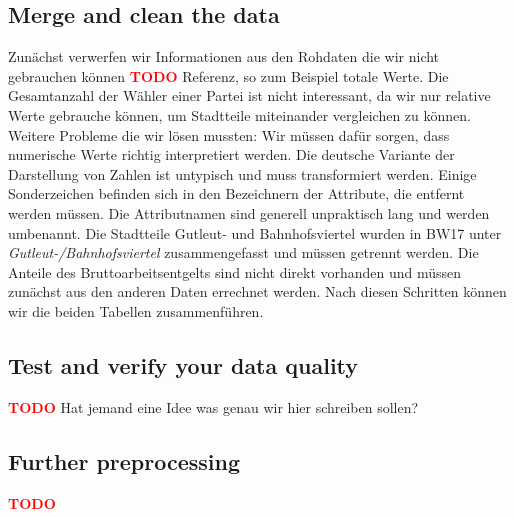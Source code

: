 \documentclass[a4paper,10pt]{scrartcl}
\newcommand{\TODO}{\textcolor{red}{\textbf{TODO }}}
\begin{document}
\subsection{Merge and clean the data}
Zunächst verwerfen wir Informationen aus den Rohdaten die wir nicht gebrauchen können \TODO{Referenz}, so zum Beispiel totale Werte. Die Gesamtanzahl der Wähler einer Partei ist nicht interessant, da wir nur relative Werte gebrauche können, um Stadtteile miteinander vergleichen zu können. Weitere Probleme die wir lösen mussten: Wir müssen dafür sorgen, dass numerische Werte richtig interpretiert werden. Die deutsche Variante der Darstellung von Zahlen ist untypisch und muss transformiert werden. Einige Sonderzeichen befinden sich in den Bezeichnern der Attribute, die entfernt werden müssen. Die Attributnamen sind generell unpraktisch lang und werden umbenannt. Die Stadtteile Gutleut- und Bahnhofsviertel wurden in BW17 unter \emph{Gutleut-/Bahnhofsviertel} zusammengefasst und müssen getrennt werden. Die Anteile des Bruttoarbeitsentgelts sind nicht direkt vorhanden und müssen zunächst aus den anderen Daten errechnet werden.
Nach diesen Schritten können wir die beiden Tabellen zusammenführen.

\subsection{Test and verify your data quality}
\TODO Hat jemand eine Idee was genau wir hier schreiben sollen? 

\subsection{Further preprocessing}
\TODO
\end{document}
